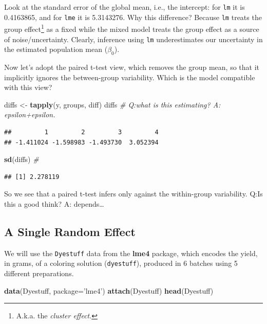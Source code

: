 \documentclass[]{book}
\newenvironment{Shaded}{\begin{snugshade}}{\end{snugshade}}
\newcommand{\KeywordTok}[1]{\textcolor[rgb]{0.13,0.29,0.53}{\textbf{#1}}}
\newcommand{\DataTypeTok}[1]{\textcolor[rgb]{0.13,0.29,0.53}{#1}}
\newcommand{\StringTok}[1]{\textcolor[rgb]{0.31,0.60,0.02}{#1}}
\newcommand{\CommentTok}[1]{\textcolor[rgb]{0.56,0.35,0.01}{\textit{#1}}}
\newcommand{\NormalTok}[1]{#1}
\theoremstyle{definition}
\theoremstyle{definition}
\theoremstyle{definition}
\theoremstyle{remark}
\begin{document}
Look at the standard error of the global mean, i.e., the intercept: for
\texttt{lm} it is 0.4163865, and for \texttt{lme} it is 5.3143276. Why
this difference? Because \texttt{lm} treats the group effect\footnote{A.k.a.
  the \emph{cluster effect}.} as a fixed while the mixed model treats
the group effect as a source of noise/uncertainty. Clearly, inference
using \texttt{lm} underestimates our uncertainty in the estimated
population mean (\(\beta_0\)).

Now let's adopt the paired t-test view, which removes the group mean, so
that it implicitly ignores the between-group variability. Which is the
model compatible with this view?

\begin{Shaded}
\begin{Highlighting}[]
\NormalTok{diffs <-}\StringTok{ }\KeywordTok{tapply}\NormalTok{(y, groups, diff) }
\NormalTok{diffs }\CommentTok{# Q:what is this estimating? A: epsilon+epsilon.}
\end{Highlighting}
\end{Shaded}

\begin{verbatim}
##         1         2         3         4 
## -1.411024 -1.598983 -1.493730  3.052394
\end{verbatim}

\begin{Shaded}
\begin{Highlighting}[]
\KeywordTok{sd}\NormalTok{(diffs) }\CommentTok{# }
\end{Highlighting}
\end{Shaded}

\begin{verbatim}
## [1] 2.278119
\end{verbatim}

So we see that a paired t-test infers only against the within-group
variability. Q:Is this a good think? A: depends\ldots{}

\subsection{A Single Random Effect}\label{a-single-random-effect}

We will use the \texttt{Dyestuff} data from the \textbf{lme4} package,
which encodes the yield, in grams, of a coloring solution
(\texttt{dyestuff}), produced in 6 batches using 5 different
preparations.

\begin{Shaded}
\begin{Highlighting}[]
\KeywordTok{data}\NormalTok{(Dyestuff, }\DataTypeTok{package=}\StringTok{'lme4'}\NormalTok{)}
\KeywordTok{attach}\NormalTok{(Dyestuff)}
\KeywordTok{head}\NormalTok{(Dyestuff)}
\end{Highlighting}
\end{Shaded}
\end{document}
